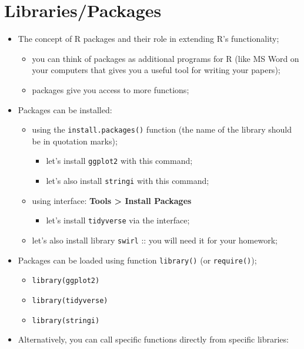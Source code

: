 \documentclass[
]{book}
\providecommand{\tightlist}{%
  \setlength{\itemsep}{0pt}\setlength{\parskip}{0pt}}
\begin{document}
\hypertarget{librariespackages}{%
\section{Libraries/Packages}\label{librariespackages}}

\begin{itemize}
\tightlist
\item
  The concept of R packages and their role in extending R's functionality;

  \begin{itemize}
  \tightlist
  \item
    you can think of packages as additional programs for R (like MS Word on your computers that gives you a useful tool for writing your papers);
  \item
    packages give you access to more functions;
  \end{itemize}
\item
  Packages can be installed:

  \begin{itemize}
  \tightlist
  \item
    using the \texttt{install.packages()} function (the name of the library should be in quotation marks);

    \begin{itemize}
    \tightlist
    \item
      let's install \texttt{ggplot2} with this command;
    \item
      let's also install \texttt{stringi} with this command;
    \end{itemize}
  \item
    using interface: \textbf{Tools \textgreater{} Install Packages}

    \begin{itemize}
    \tightlist
    \item
      let's install \texttt{tidyverse} via the interface;
    \end{itemize}
  \item
    let's also install library \texttt{swirl} :: you will need it for your homework;
  \end{itemize}
\item
  Packages can be loaded using function \texttt{library()} (or \texttt{require()});

  \begin{itemize}
  \tightlist
  \item
    \texttt{library(ggplot2)}
  \item
    \texttt{library(tidyverse)}
  \item
    \texttt{library(stringi)}
  \end{itemize}
\item
  Alternatively, you can call specific functions directly from specific libraries:


\end{itemize}
\end{document}
